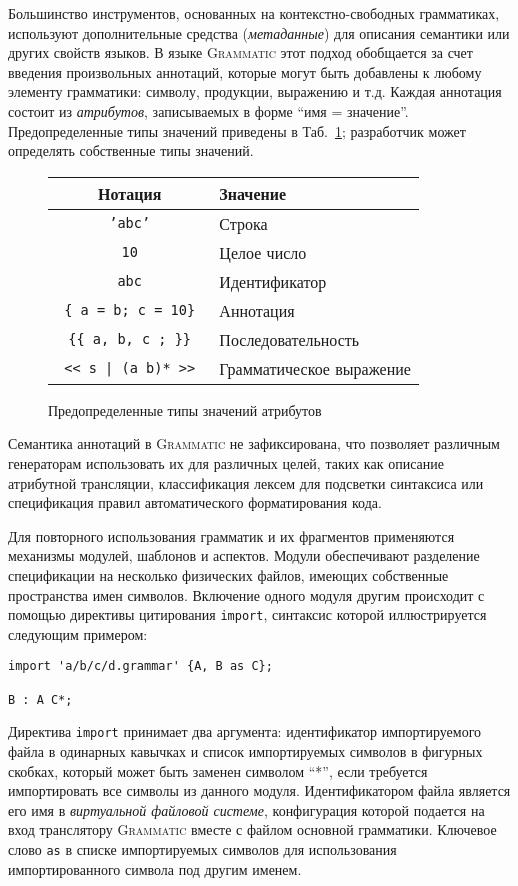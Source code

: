 \documentclass[12pt,a4paper]{article}
\newcommand{\tabref}[1]{Таб.~\ref{#1}}
\newcommand{\term}[1]{\emph{#1}}
\newcommand{\code}[1]{\mbox{\texttt{#1}}}
\newcommand{\tool}[1]{\textsc{#1}}
\theoremstyle{definition}
\theoremstyle{plain}
\newcommand{\GRM}{\tool{Grammatic}}
\begin{document}
Большинство инструментов, основанных на контекстно-свободных грамматиках, используют дополнительные средства (\term{метаданные}) для описания семантики или других свойств языков. В языке \GRM{} этот подход обобщается за счет введения произвольных аннотаций, которые могут быть добавлены к любому элементу грамматики: символу, продукции, выражению и т.д. Каждая аннотация состоит из \term{атрибутов}, записываемых в форме ``имя = значение''. Предопределенные типы значений приведены в \tabref{valtypes}; разработчик может определять собственные типы значений.
\begin{figure}[htbp]
\center
	\begin{tabular}{|c|l|}
	\hline
	\bf Нотация & \bf Значение \\
	\hline
	\code{'abc'} & Строка \\
	\code{10} & Целое число \\
	\code{abc} & Идентификатор \\
	\code{\{ a = b; c = 10\}} & Аннотация \\
	\code{ \{\{ a, b, c ; \}\} } & Последовательность \\
	\code{ \texttt{<}< s | (a b)* >\texttt{>} } & Грамматическое выражение \\
	\hline
	\end{tabular}
	\caption{Предопределенные типы значений атрибутов}\label{valtypes}
\end{figure}
Семантика аннотаций в \GRM{} не зафиксирована, что позволяет различным генераторам использовать их для различных целей, таких как описание атрибутной трансляции, классификация лексем для подсветки синтаксиса или спецификация правил автоматического форматирования кода.

Для повторного использования грамматик и их фрагментов применяются механизмы модулей, шаблонов и аспектов. Модули обеспечивают разделение спецификации на несколько физических файлов, имеющих собственные пространства имен символов. Включение одного модуля другим происходит с помощью директивы цитирования \code{import}, синтаксис которой иллюстрируется следующим примером:
\begin{lstlisting}
import 'a/b/c/d.grammar' {A, B as C};

B : A C*;
\end{lstlisting}  
Директива \code{import} принимает два аргумента: идентификатор импортируемого файла в одинарных кавычках и список импортируемых символов в фигурных скобках, который может быть заменен символом ``*'', если требуется импортировать все символы из данного модуля. Идентификатором файла является его имя в \term{виртуальной файловой системе}, конфигурация которой подается на вход транслятору \GRM{} вместе с файлом основной грамматики. Ключевое слово \code{as} в списке импортируемых символов для использования импортированного символа под другим именем.
\end{document}
